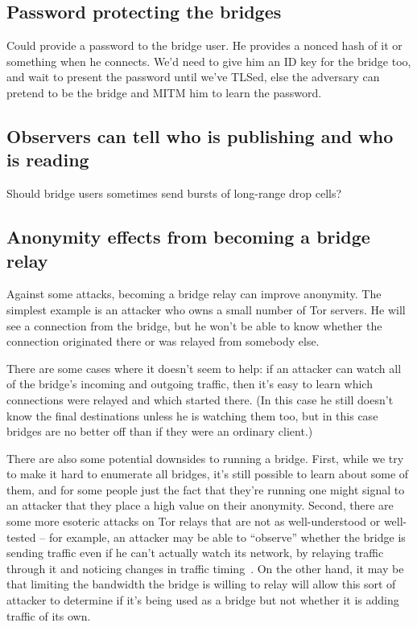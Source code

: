 \documentclass{llncs}
\begin{document}
\subsection{Password protecting the bridges}

Could provide a password to the bridge user. He provides a nonced hash of
it or something when he connects. We'd need to give him an ID key for the
bridge too, and wait to present the password until we've TLSed, else the
adversary can pretend to be the bridge and MITM him to learn the password.




\subsection{Observers can tell who is publishing and who is reading}
\label{subsec:upload-padding}

Should bridge users sometimes send bursts of long-range drop cells?


\subsection{Anonymity effects from becoming a bridge relay}

Against some attacks, becoming a bridge relay can improve anonymity. The
simplest example is an attacker who owns a small number of Tor servers. He
will see a connection from the bridge, but he won't be able to know
whether the connection originated there or was relayed from somebody else.

There are some cases where it doesn't seem to help: if an attacker can
watch all of the bridge's incoming and outgoing traffic, then it's easy
to learn which connections were relayed and which started there. (In this
case he still doesn't know the final destinations unless he is watching
them too, but in this case bridges are no better off than if they were
an ordinary client.)

There are also some potential downsides to running a bridge. First, while
we try to make it hard to enumerate all bridges, it's still possible to
learn about some of them, and for some people just the fact that they're
running one might signal to an attacker that they place a high value
on their anonymity. Second, there are some more esoteric attacks on Tor
relays that are not as well-understood or well-tested -- for example, an
attacker may be able to ``observe'' whether the bridge is sending traffic
even if he can't actually watch its network, by relaying traffic through
it and noticing changes in traffic timing~\cite{attack-tor-oak05}. On
the other hand, it may be that limiting the bandwidth the bridge is
willing to relay will allow this sort of attacker to determine if it's
being used as a bridge but not whether it is adding traffic of its own.
\end{document}
